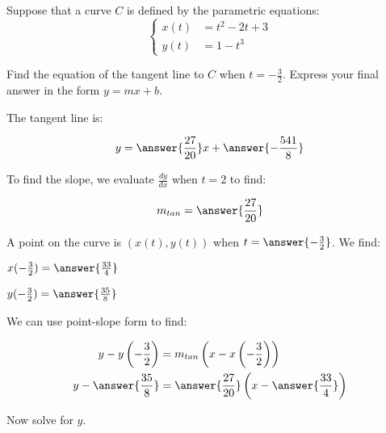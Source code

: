 \documentclass{ximera}
\author{Alex Beckwith}
\begin{document}
\begin{exercise}
Suppose that a curve $C$ is defined by the parametric equations:
\[
\begin{cases}
x(t) &= t^2-2t+3 \\
y(t) &= 1-t^3
\end{cases}
\]

Find the equation of the tangent line to $C$ when $t = -\frac{3}{2}$.  Express your final answer in the form $y=mx+b$.

The tangent line is:

\[
y = \answer{\frac{27}{20}}x+\answer{-\frac{541}{8}}
\]

\begin{hint}
To find the slope, we evaluate $\frac{dy}{dx}$ when $t=2$ to find:

\[
m_{tan} = \answer{\frac{27}{20}}
\]

A point on the curve is $(x(t),y(t))$ when $t=\answer{-\frac{3}{2}}$.  We find:

$x(-\frac{3}{2}) = \answer{\frac{33}{4}}$

$y(-\frac{3}{2}) = \answer{\frac{35}{8}}$

We can use point-slope form to find:

\begin{align*}
y-y\left(-\frac{3}{2}\right) &= m_{tan}\left(x-x\left(-\frac{3}{2}\right)\right) \\
y- \answer{\frac{35}{8}} &= \answer{\frac{27}{20}} \left( x-\answer{\frac{33}{4}} \right)
\end{align*}

Now solve for $y$.

\end{hint}

\end{exercise}
\end{document}
